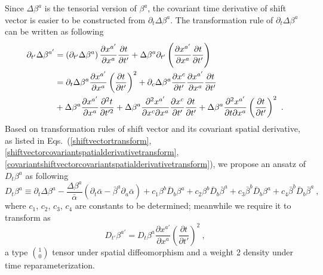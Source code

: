 Since $\Delta \beta^{a}$ is the tensorial version of $\beta^{a}$, the covariant time derivative of shift vector is easier to be constructed from $\partial_{t}\Delta \beta^{a}$. The transformation rule of $\partial_{t}\Delta \beta^{a}$ can be written as following
\begin{align}\label{covariantshifttimederivative} 
\partial_{t'}\Delta \beta^{a'} & = \left(\partial_{t'}\Delta \beta^{a}\right)\frac{\partial x^{a'}}{\partial x^{a}}\frac{\partial t}{\partial t'} + \Delta \beta^{a}\partial_{t'}\left(\frac{\partial x^{a'}}{\partial x^{a}}\frac{\partial t}{\partial t'}\right)\notag\\
& = \partial_{t}\Delta \beta^{a}\frac{\partial x^{a'}}{\partial x^{a}}\left(\frac{\partial t}{\partial t'}\right)^{2} + \partial_{c}\Delta \beta^{a}\frac{\partial x^{c}}{\partial t'}\frac{\partial x^{a'}}{\partial x^{a}}\frac{\partial t}{\partial t'}\notag\\
& + \Delta \beta^{a}\frac{\partial x^{a'}}{\partial x^{a}}\frac{\partial^{2}t}{\partial t'^{2}} + \Delta \beta^{a}\frac{\partial^{2} x^{a'}}{\partial x^{c}\partial x^{a}}\frac{\partial x^{c}}{\partial t'}\frac{\partial t}{\partial t'} + \Delta \beta^{a}\frac{\partial^{2}x^{a'}}{\partial t\partial x^{a}}\left(\frac{\partial t}{\partial t'}\right)^{2} \ .
\end{align}
Based on transformation rules of shift vector and its covariant spatial derivative, as listed in Eqs.~(\ref{shiftvectortransform}, \ref{shiftvectorcovariantspatialderivativetransform}, \ref{covariantshiftvectorcovariantspatialderivativetransform}), we propose an ansatz of $D_{t}\beta^{a}$ as following
\begin{equation}
	D_{t}\beta^{a} \equiv \partial_{t}\Delta \beta^{a} - \frac{\Delta \beta^{a}}{{\bar \alpha}}\left(\partial_{t}{\bar \alpha} - {\bar \beta}^{a}\partial_{a}{\bar \alpha}\right) + c_{1}\beta^{b}{\bar D}_{b}\beta^{a} + c_{2}\beta^{b}{\bar D}_{b}{\bar \beta}^{a} + c_{3}{\bar \beta}^{b}{\bar D}_{b}\beta^{a} + c_{4}{\bar \beta}^{b}{\bar D}_{b}{\bar \beta}^{a}	\ ,
\end{equation}
where $c_{1}$, $c_{2}$, $c_{3}$, $c_{4}$ are constants to be determined; meanwhile we require it to transform as
\begin{equation}
	D_{t'}\beta^{a'} = D_{t}\beta^{a}\frac{\partial x^{a'}}{\partial x^{a}}\left(\frac{\partial t}{\partial t'}\right)^{2} \ ,
\end{equation}
a type $1 \choose 0$ tensor under spatial diffeomorphism and a weight 2 density under time reparameterization. 

